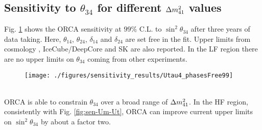 \subsection{Sensitivity to $\theta_{34}$ for different $\Delta m^2_{41}$ values}
Fig. \ref{fig:sen-Ut} shows the ORCA sensitivity at $99\%$ C.L. to $\sin^2\theta_{34}$ after three years of data taking. Here, $\theta_{14}$, $\theta_{24}$, $\delta_{14}$ and $\delta_{24}$ are set free in the fit. Upper limits from cosmology \cite{strongboundCosmology}, IceCube/DeepCore \cite{DeepCore_Steriles} and SK \cite{SK} are also reported. In the LF region there are no upper limits on $\theta_{34}$ coming from other experiments. 
\begin{figure}[h!]
\centering
\texttt{[image: ./figures/sensitivity\_results/Utau4\_phasesFree99]}
\label{fig:sen-Ut}
\end{figure}
\\
ORCA is able to constrain $\theta_{34}$ over a broad range of $\Delta m^2_{41}$. In the HF region, consistently with Fig. \ref{fig:sen-Um-Ut}, ORCA can improve current upper limits on $\sin^2\theta_{34}$ by about a factor two. 